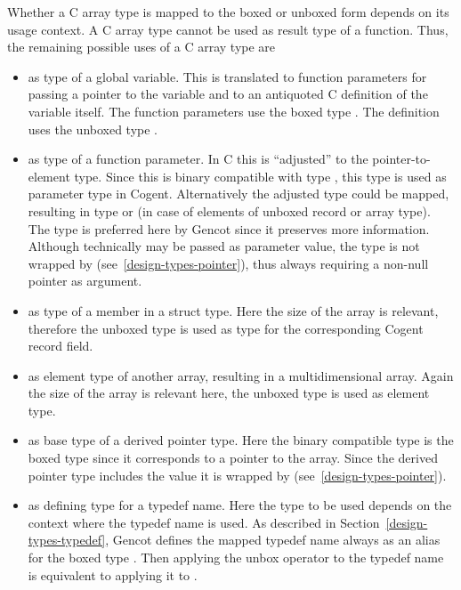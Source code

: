 Whether a C array type is mapped to the boxed or unboxed form depends on its usage context.
A C array type cannot be used as result type of a function. Thus, the remaining possible uses of a C array type are
\begin{itemize}
\item as type of a global variable. This is translated to function parameters for passing a pointer to the variable 
and to an antiquoted C definition of the variable itself. The function parameters use the boxed type 
. The definition uses the unboxed type .
\item as type of a function parameter. In C this is ``adjusted'' to the pointer-to-element type. Since this
is binary compatible with type , this type is used as parameter type in Cogent. Alternatively 
the adjusted type could be mapped, resulting in type  or  (in case of elements of unboxed 
record or array type). The type  is preferred here by Gencot since it preserves more information.
Although technically  may be passed as parameter value, the type is not wrapped by  
(see~\ref{design-types-pointer}), thus always requiring a non-null pointer as argument.
\item as type of a member in a struct type. Here the size of the array is relevant, therefore the unboxed type
 is used as type for the corresponding Cogent record field.
\item as element type of another array, resulting in a multidimensional array. Again the size of the array 
is relevant here, the unboxed type  is used as element type.
\item as base type of a derived pointer type. Here the binary compatible type is the boxed type 
since it corresponds to a pointer to the array. Since the derived pointer type includes the  value
it is wrapped by  (see~\ref{design-types-pointer}).
\item as defining type for a typedef name. Here the type to be used depends on the context where the typedef
name is used. As described in Section~\ref{design-types-typedef}, Gencot defines the mapped 
typedef name always as an alias for the boxed type . Then applying the unbox operator to the typedef name 
is equivalent to applying it to .
\end{itemize}

